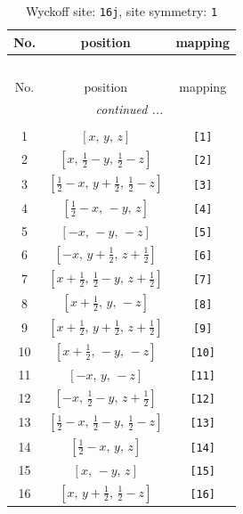 \documentclass[fleqn,8pt]{jsarticle}
\begin{document}
\begin{longtable}{ccc}
\caption{Wyckoff site: {\tt 16j}, site symmetry: {\tt 1}}
 \\
 \hline \hline
No. & position & mapping \\ \hline \endfirsthead

\multicolumn{2}{l}{\tablename\ \thetable{}} \\
 \hline \hline
No. & position & mapping \\ \hline \endhead

 \hline \hline
\multicolumn{2}{r}{\footnotesize\it continued ...} \\ \endfoot

 \hline \hline
\multicolumn{2}{r}{} \\ \endlastfoot

1 & $\left[ x,\, y,\, z \right]$ & {\tt [1]} \\ \hline
2 & $\left[ x,\, \frac{1}{2} - y,\, \frac{1}{2} - z \right]$ & {\tt [2]} \\ \hline
3 & $\left[ \frac{1}{2} - x,\, y + \frac{1}{2},\, \frac{1}{2} - z \right]$ & {\tt [3]} \\ \hline
4 & $\left[ \frac{1}{2} - x,\, - y,\, z \right]$ & {\tt [4]} \\ \hline
5 & $\left[ - x,\, - y,\, - z \right]$ & {\tt [5]} \\ \hline
6 & $\left[ - x,\, y + \frac{1}{2},\, z + \frac{1}{2} \right]$ & {\tt [6]} \\ \hline
7 & $\left[ x + \frac{1}{2},\, \frac{1}{2} - y,\, z + \frac{1}{2} \right]$ & {\tt [7]} \\ \hline
8 & $\left[ x + \frac{1}{2},\, y,\, - z \right]$ & {\tt [8]} \\ \hline
9 & $\left[ x + \frac{1}{2},\, y + \frac{1}{2},\, z + \frac{1}{2} \right]$ & {\tt [9]} \\ \hline
10 & $\left[ x + \frac{1}{2},\, - y,\, - z \right]$ & {\tt [10]} \\ \hline
11 & $\left[ - x,\, y,\, - z \right]$ & {\tt [11]} \\ \hline
12 & $\left[ - x,\, \frac{1}{2} - y,\, z + \frac{1}{2} \right]$ & {\tt [12]} \\ \hline
13 & $\left[ \frac{1}{2} - x,\, \frac{1}{2} - y,\, \frac{1}{2} - z \right]$ & {\tt [13]} \\ \hline
14 & $\left[ \frac{1}{2} - x,\, y,\, z \right]$ & {\tt [14]} \\ \hline
15 & $\left[ x,\, - y,\, z \right]$ & {\tt [15]} \\ \hline
16 & $\left[ x,\, y + \frac{1}{2},\, \frac{1}{2} - z \right]$ & {\tt [16]} \\
\end{longtable}
\end{document}
